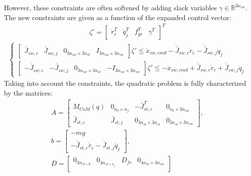 \begin{itemize}
    However, these constraints are often softened by adding slack variables $\gamma\in\mathbb{R}^{3n_{sw}}$. The new constraints are given as a function of the expanded control vector:
    \begin{gather*}
        \zeta'=
        \begin{bmatrix}
            \ddot{r}_c^T&\ddot{q}_j^T&f_{gr}^T&\gamma^T
        \end{bmatrix}^T
    \end{gather*}
    \begin{gather}\label{legged_robotics_swing_leg_task_constraints}
        \begin{cases}
            \begin{bmatrix}
                \bar{J}_{sw,c}&\bar{J}_{sw,j}& 0_{3n_{sw}\times 3n_{st}} & I_{3n_{sw}\times 3n_{sw}}
            \end{bmatrix}\zeta'\leq \ddot{x}_{sw,cmd}-\dot{\bar{J}}_{sw,c}\dot{r}_{c}-\dot{\bar{J}}_{sw,j}\dot{q}_j\\
            \begin{bmatrix}
                -\bar{J}_{sw,c}&-\bar{J}_{sw,j}& 0_{3n_{sw}\times 3n_{st}} & -I_{3n_{sw}\times 3n_{sw}}
            \end{bmatrix}\zeta'\leq -\ddot{x}_{sw,cmd}+\dot{\bar{J}}_{sw,c}\dot{r}_{c}+\dot{\bar{J}}_{sw,j}\dot{q}_j
        \end{cases}
    \end{gather}
    Taking into account the constraints, the quadratic problem is fully characterized by the matrices:
    \begin{gather}\label{legged_robot_QP_matrices}
        A=
        \begin{bmatrix}
            M_{CoM}(q) & 0_{n_b\times n_j} & -\bar{J}_{st,c}^T & 0_{n_b\times 3n_{sw}}\\
            \bar{J}_{st,c} & \bar{J}_{st,j} & 0_{3n_{st}\times 3n_{st}} & 0_{3n_{st}\times 3n_{sw}}
        \end{bmatrix},\\
        b=
        \begin{bmatrix}
            -mg\\
            -\dot{\bar{J}}_{st,c}\dot{r}_{c}-\dot{\bar{J}}_{st,j}\dot{q}_j
        \end{bmatrix},\\
        D=
        \begin{bmatrix}
            0_{3n_{st\times 6}} & 0_{4n_{st\times n_{j}}} & D_{fr} & 0_{4n_{st}\times 3n_{sw}}\\

\end{bmatrix}
\end{gather}
\end{itemize}
